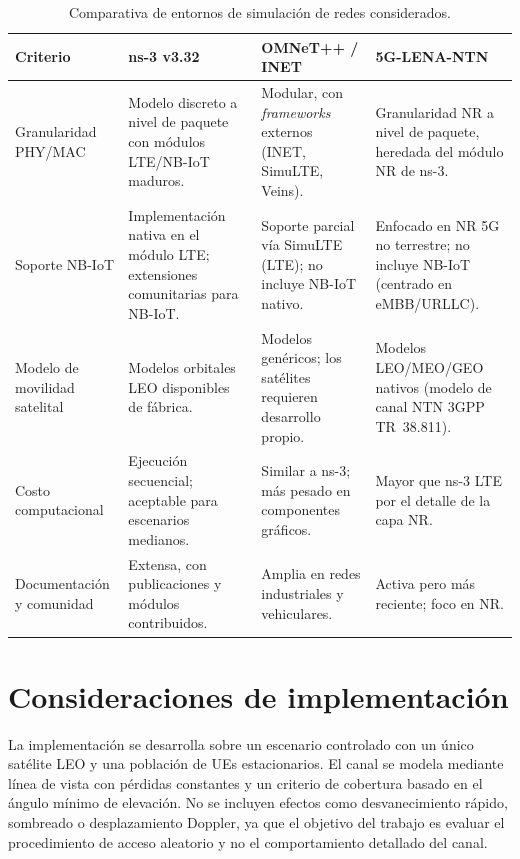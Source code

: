 \begin{table}[H]
\centering
\caption{Comparativa de entornos de simulación de redes considerados.}
\label{tab:impl_herramientas}
\small
\renewcommand{\arraystretch}{1.25}
\begin{tabular}{@{}>{\raggedright\arraybackslash}p{3.2cm}
                 >{\raggedright\arraybackslash}p{3.9cm}
                 >{\raggedright\arraybackslash}p{3.9cm}
                 >{\raggedright\arraybackslash}p{3.9cm}@{}}
\toprule
\textbf{Criterio} & \textbf{ns-3 v3.32} & \textbf{OMNeT++ / INET} & \textbf{5G-LENA-NTN} \\
\midrule
Granularidad PHY/MAC & Modelo discreto a nivel de paquete con módulos LTE/NB-IoT maduros. & Modular, con \emph{frameworks} externos (INET, SimuLTE, Veins). & Granularidad NR a nivel de paquete, heredada del módulo NR de ns-3. \\
\addlinespace
Soporte NB-IoT & Implementación nativa en el módulo LTE; extensiones comunitarias para NB-IoT. & Soporte parcial vía SimuLTE (LTE); no incluye NB-IoT nativo. & Enfocado en NR 5G no terrestre; no incluye NB-IoT (centrado en eMBB/URLLC). \\
\addlinespace
Modelo de movilidad satelital & Modelos orbitales LEO disponibles de fábrica. & Modelos genéricos; los satélites requieren desarrollo propio. & Modelos LEO/MEO/GEO nativos (modelo de canal NTN 3GPP TR~38.811). \\
\addlinespace
Costo computacional & Ejecución secuencial; aceptable para escenarios medianos. & Similar a ns-3; más pesado en componentes gráficos. & Mayor que ns-3 LTE por el detalle de la capa NR. \\
\addlinespace
Documentación y comunidad & Extensa, con publicaciones y módulos contribuidos. & Amplia en redes industriales y vehiculares. & Activa pero más reciente; foco en NR. \\
\bottomrule
\end{tabular}
\end{table}

\section{Consideraciones de implementación}
\label{sec:impl_limitaciones}

La implementación se desarrolla sobre un escenario controlado con un único satélite LEO y una población de UEs estacionarios. El canal se modela mediante línea de vista con pérdidas constantes y un criterio de cobertura basado en el ángulo mínimo de elevación. No se incluyen efectos como desvanecimiento rápido, sombreado o desplazamiento Doppler, ya que el objetivo del trabajo es evaluar el procedimiento de acceso aleatorio y no el comportamiento detallado del canal.

